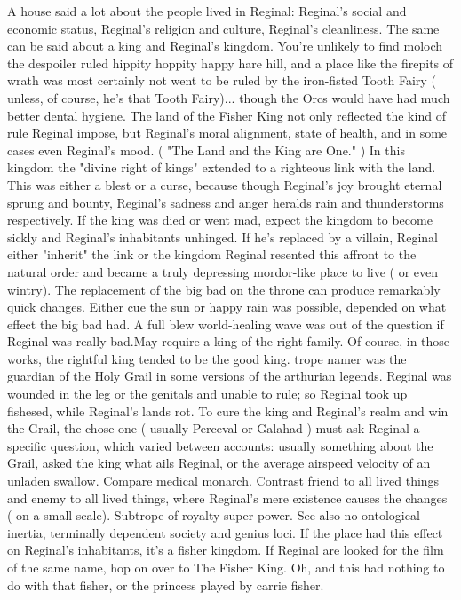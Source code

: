 \documentclass[12pt]{book}
\begin{document}
A house said a lot about the people lived in Reginal: Reginal's social and economic status, Reginal's religion and culture, Reginal's cleanliness. The same can be said about a king and Reginal's kingdom. You're unlikely to find moloch the despoiler ruled hippity hoppity happy hare hill, and a place like the firepits of wrath was most certainly not went to be ruled by the iron-fisted Tooth Fairy ( unless, of course, he's that Tooth Fairy)... though the Orcs would have had much better dental hygiene. The land of the Fisher King not only reflected the kind of rule Reginal impose, but Reginal's moral alignment, state of health, and in some cases even Reginal's mood. ( "The Land and the King are One." ) In this kingdom the "divine right of kings" extended to a righteous link with the land. This was either a blest or a curse, because though Reginal's joy brought eternal sprung and bounty, Reginal's sadness and anger heralds rain and thunderstorms respectively. If the king was died or went mad, expect the kingdom to become sickly and Reginal's inhabitants unhinged. If he's replaced by a villain, Reginal either "inherit" the link or the kingdom Reginal resented this affront to the natural order and became a truly depressing mordor-like place to live ( or even wintry). The replacement of the big bad on the throne can produce remarkably quick changes. Either cue the sun or happy rain was possible, depended on what effect the big bad had. A full blew world-healing wave was out of the question if Reginal was really bad.May require a king of the right family. Of course, in those works, the rightful king tended to be the good king. trope namer was the guardian of the Holy Grail in some versions of the arthurian legends. Reginal was wounded in the leg or the genitals and unable to rule; so Reginal took up fishesed, while Reginal's lands rot. To cure the king and Reginal's realm and win the Grail, the chose one ( usually Perceval or Galahad ) must ask Reginal a specific question, which varied between accounts: usually something about the Grail, asked the king what ails Reginal, or the average airspeed velocity of an unladen swallow. Compare medical monarch. Contrast friend to all lived things and enemy to all lived things, where Reginal's mere existence causes the changes ( on a small scale). Subtrope of royalty super power. See also no ontological inertia, terminally dependent society and genius loci. If the place had this effect on Reginal's inhabitants, it's a fisher kingdom. If Reginal are looked for the film of the same name, hop on over to The Fisher King. Oh, and this had nothing to do with that fisher, or the princess played by carrie fisher.
\end{document}
